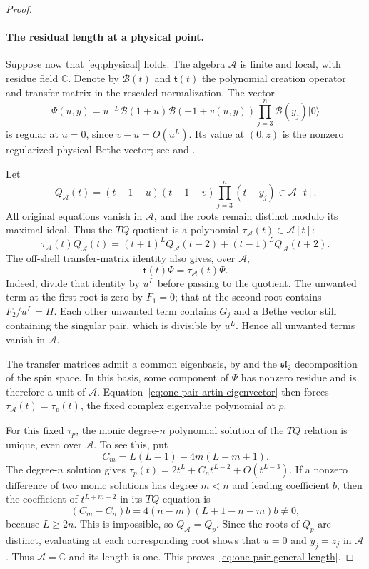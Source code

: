 \documentclass[11pt]{article}
\theoremstyle{definition}
\newcommand{\C}{\mathbb C}
\begin{document}
\begin{proof}
\paragraph{The residual length at a physical point.}
Suppose now that \eqref{eq:physical} holds. The algebra $\mathcal A$
is finite and local, with residue field $\C$. Denote by
$\mathcal B(t)$ and $\mathsf t(t)$ the polynomial creation operator
and transfer matrix in the rescaled normalization. The vector
\[
 \Psi(u,y)=u^{-L}\mathcal B(1+u)\mathcal B(-1+v(u,y))
                    \prod_{j=3}^n\mathcal B(y_j)|0\rangle
\]
is regular at $u=0$, since $v-u=O(u^L)$. Its value at $(0,z)$ is
the nonzero regularized physical Bethe vector; see
\cite[Section~3]{NW2013} and \cite[Lemmas~3--4]{GJ2020}.

Let
\[
 Q_{\mathcal A}(t)=(t-1-u)(t+1-v)\prod_{j=3}^n(t-y_j)
 \in\mathcal A[t].
\]
All original equations vanish in $\mathcal A$, and the roots remain
distinct modulo its maximal ideal. Thus the $TQ$ quotient is a
polynomial $\tau_{\mathcal A}(t)\in\mathcal A[t]$:
\[
 \tau_{\mathcal A}(t)Q_{\mathcal A}(t)
 =(t+1)^LQ_{\mathcal A}(t-2)+(t-1)^LQ_{\mathcal A}(t+2).
\]
The off-shell transfer-matrix identity also gives, over $\mathcal A$,
\begin{equation}\label{eq:one-pair-artin-eigenvector}
 \mathsf t(t)\Psi=\tau_{\mathcal A}(t)\Psi.
\end{equation}
Indeed, divide that identity by $u^L$ before passing to the quotient.
The unwanted term at the first root is zero by $F_1=0$; that at the
second root contains $F_2/u^L=H$. Each other unwanted term contains
$G_j$ and a Bethe vector still containing the singular pair, which is
divisible by $u^L$. Hence all unwanted terms vanish in $\mathcal A$.

The transfer matrices admit a common eigenbasis, by
\cite[Theorem~12.6.1]{MTV2009} and the $\mathfrak{sl}_2$
decomposition of the spin space. In this basis, some component of
$\Psi$ has nonzero residue and is therefore a unit of $\mathcal A$.
Equation~\eqref{eq:one-pair-artin-eigenvector} then forces
$\tau_{\mathcal A}(t)=\tau_p(t)$, the fixed complex eigenvalue
polynomial at $p$.

For this fixed $\tau_p$, the monic degree-$n$ polynomial solution of
the $TQ$ relation is unique, even over $\mathcal A$. To see this, put
\[
 C_m=L(L-1)-4m(L-m+1).
\]
The degree-$n$ solution gives
$\tau_p(t)=2t^L+C_nt^{L-2}+O(t^{L-3})$. If a nonzero difference
of two monic solutions has degree $m<n$ and leading coefficient $b$,
then the coefficient of $t^{L+m-2}$ in its $TQ$ equation is
\[
 (C_m-C_n)b=4(n-m)(L+1-n-m)b\ne0,
\]
because $L\ge2n$. This is impossible, so
$Q_{\mathcal A}=Q_p$. Since the roots of $Q_p$ are distinct,
evaluating at each corresponding root shows that
$u=0$ and $y_j=z_j$ in $\mathcal A$. Thus $\mathcal A=\C$ and
its length is one. This proves~\eqref{eq:one-pair-general-length}.


\end{proof}
\end{document}
